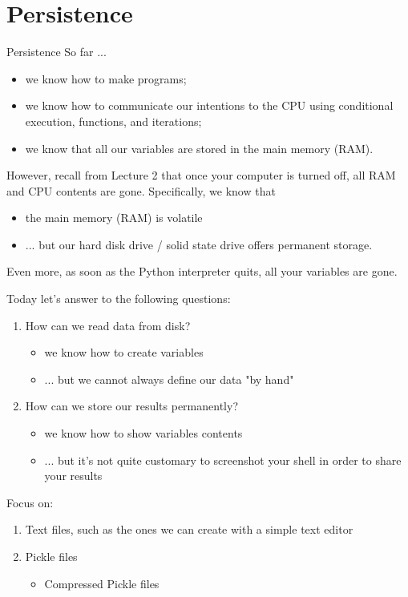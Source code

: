 \documentclass[t,handout,9pt]{beamer}
\begin{document}
\section{Persistence}
\begin{frame}{Persistence}
\vfill
So far ...
\begin{itemize}
	\item we know how to make programs;
	\item we know how to communicate our intentions to the CPU using conditional execution, functions, and iterations;
	\item we know that all our variables are stored in the main memory (RAM).
\end{itemize}
However, recall from Lecture 2 that once your computer is turned off, all RAM and CPU contents are gone.
\vfill
Specifically, we know that
\begin{itemize}
	\item the main memory (RAM) is volatile
	\item ... but our hard disk drive / solid state drive offers permanent storage.
\end{itemize}
\vfill
Even more, as soon as the Python interpreter quits, all your variables are gone.
\vfill
\end{frame}
%
\begin{frame}
\vfill
Today let's answer to the following questions:
\begin{enumerate}
	\item How can we read data from disk?
	\begin{itemize}
		\item we know how to create variables
		\item ... but we cannot always define our data "by hand"
	\end{itemize}
	\item How can we store our results permanently?
	\begin{itemize}
		\item we know how to show variables contents
		\item ... but it's not quite customary to screenshot your shell in order to share your results
	\end{itemize}
\end{enumerate}
\vfill
Focus on:
\begin{enumerate}
	\item Text files, such as the ones we can create with a simple text editor
	\item Pickle files
	\begin{itemize}
		\item Compressed Pickle files
	\end{itemize}
\end{enumerate}
\vfill
\end{frame}
\end{document}
